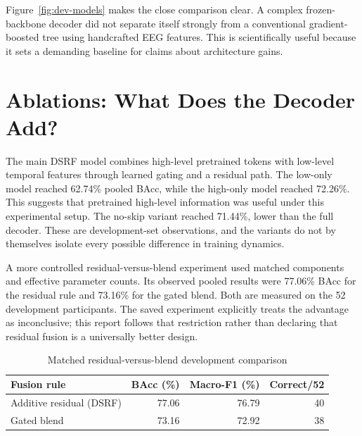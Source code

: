 
Figure~\ref{fig:dev-models} makes the close comparison clear. A complex frozen-backbone decoder did not separate itself strongly from a conventional gradient-boosted tree using handcrafted EEG features. This is scientifically useful because it sets a demanding baseline for claims about architecture gains.

\section{Ablations: What Does the Decoder Add?}
The main DSRF model combines high-level pretrained tokens with low-level temporal features through learned gating and a residual path. The low-only model reached 62.74\% pooled BAcc, while the high-only model reached 72.26\%. This suggests that pretrained high-level information was useful under this experimental setup. The no-skip variant reached 71.44\%, lower than the full decoder. These are development-set observations, and the variants do not by themselves isolate every possible difference in training dynamics.

A more controlled residual-versus-blend experiment used matched components and effective parameter counts. Its observed pooled results were 77.06\% BAcc for the residual rule and 73.16\% for the gated blend. Both are measured on the 52 development participants. The saved experiment explicitly treats the advantage as inconclusive; this report follows that restriction rather than declaring that residual fusion is a universally better design.

\begin{table}[htbp]\centering\small
\caption{Matched residual-versus-blend development comparison}\label{tab:skip}
\begin{tabular}{@{}lrrr@{}}\toprule\textbf{Fusion rule}&\textbf{BAcc (\%)}&\textbf{Macro-F1 (\%)}&\textbf{Correct/52}\\\midrule
Additive residual (DSRF)&77.06&76.79&40\\
Gated blend&73.16&72.92&38\\\bottomrule
\end{tabular}\end{table}

